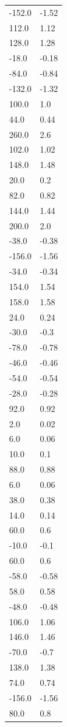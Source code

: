 \begin{longtable}{ll}
-152.0 & -1.52 \\
112.0 & 1.12 \\
128.0 & 1.28 \\
-18.0 & -0.18 \\
-84.0 & -0.84 \\
-132.0 & -1.32 \\
100.0 & 1.0 \\
44.0 & 0.44 \\
260.0 & 2.6 \\
102.0 & 1.02 \\
148.0 & 1.48 \\
20.0 & 0.2 \\
82.0 & 0.82 \\
144.0 & 1.44 \\
200.0 & 2.0 \\
-38.0 & -0.38 \\
-156.0 & -1.56 \\
-34.0 & -0.34 \\
154.0 & 1.54 \\
158.0 & 1.58 \\
24.0 & 0.24 \\
-30.0 & -0.3 \\
-78.0 & -0.78 \\
-46.0 & -0.46 \\
-54.0 & -0.54 \\
-28.0 & -0.28 \\
92.0 & 0.92 \\
2.0 & 0.02 \\
6.0 & 0.06 \\
10.0 & 0.1 \\
88.0 & 0.88 \\
6.0 & 0.06 \\
38.0 & 0.38 \\
14.0 & 0.14 \\
60.0 & 0.6 \\
-10.0 & -0.1 \\
60.0 & 0.6 \\
-58.0 & -0.58 \\
58.0 & 0.58 \\
-48.0 & -0.48 \\
106.0 & 1.06 \\
146.0 & 1.46 \\
-70.0 & -0.7 \\
138.0 & 1.38 \\
74.0 & 0.74 \\
-156.0 & -1.56 \\
80.0 & 0.8 \\

\end{longtable}
